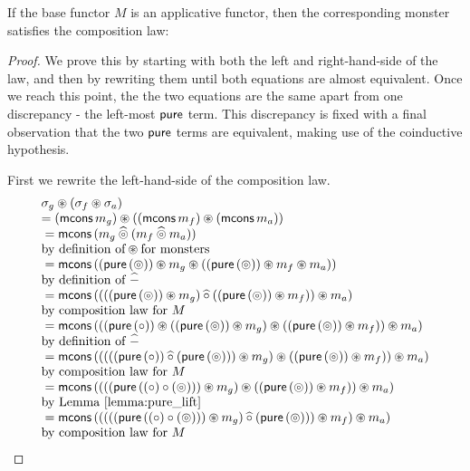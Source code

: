 \begin{lemma}
If the base functor $M$ is an applicative functor, then the corresponding monster satisfies the composition law:
\begin{proof}

We prove this by starting with both the left and right-hand-side of the law, and then by rewriting them until both equations are almost equivalent. Once we reach this point, the the two equations are the same apart from one discrepancy - the left-most $\mathsf{pure}$ term. This discrepancy is fixed with a final observation that the two $\mathsf{pure}$ terms are equivalent, making use of the coinductive hypothesis.

First we rewrite the left-hand-side of the composition law. 
$$
\begin{array}{ll}
\sigma_g \appl (\sigma_f \appl \sigma_a) \\
 = (\mcons\,m_g) \appl ((\mcons\,m_f) \appl (\mcons\,m_a))\\
{}= \mcons\,(m_g \alift{\pappl} (m_f \alift{\pappl} m_a)) \\
\mbox{by definition of}\appl\mbox{for monsters} \\
{}= \mcons\,((\apure\, (\pappl)) \appl m_g \appl ((\apure\, (\pappl)) \appl m_f \appl m_a)) \\
 \mbox{by definition of }\alift{-}\\
{}= \mcons\,( (  ((\apure\, (\pappl)) \appl m_g) \alift{\comp} ((\apure\, (\pappl)) \appl m_f)  ) \appl m_a) \\
 \mbox{by composition law for }M \\
{}= \mcons\,( (  (\apure\, (\comp)) \appl  ((\apure\, (\pappl)) \appl m_g) \appl ((\apure\, (\pappl)) \appl m_f)  ) \appl m_a) \\
 \mbox{by definition of }\alift{-}\\
{}= \mcons\,( (  ( ((\apure\, (\comp)) \alift{\comp}  (\apure\, (\pappl))) \appl m_g ) \appl ((\apure\, (\pappl)) \appl m_f)  ) \appl m_a) \\
 \mbox{by composition law for }M \\
{}= \mcons\,( (  ( (\apure\, ((\comp) \comp (\pappl)) ) \appl m_g ) \appl ((\apure\, (\pappl)) \appl m_f)  ) \appl m_a)\\
 \mbox{by Lemma \ref{lemma:pure_lift}}\\
{}= \mcons\,( (  (( (\apure\, ((\comp) \comp (\pappl)) ) \appl m_g ) \alift{\comp} (\apure\, (\pappl))) \appl m_f  ) \appl m_a)\\
 \mbox{by composition law for }M \\

\end{array}$$
\end{proof}
\end{lemma}

